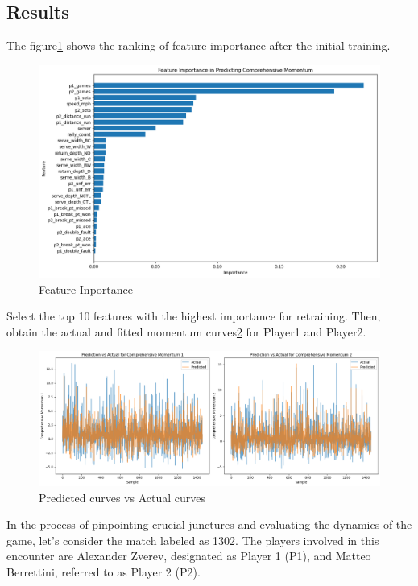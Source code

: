 \documentclass[12pt]{article}  %
\begin{document}
\subsection{Results}
The figure\ref{feature} shows the ranking of feature importance 
after the initial training.
\begin{figure}[h]  %
    \centering  %
    \includegraphics[width=.9\textwidth]{feature_inmportance.png} %
    \caption{Feature Inportance} %
    \label{feature}
\end{figure}

Select the top 10 features with the highest importance for retraining. 
Then, obtain the actual and fitted momentum curves\ref*{pred_act} for Player1 and Player2.
\begin{figure}[h]  %
    \centering  %
    \includegraphics[width=.9\textwidth]{pred_act.png} %
    \caption{Predicted curves vs Actual curves} %
    \label{pred_act}
\end{figure}

In the process of pinpointing crucial junctures and evaluating
the dynamics of the game, let's consider the match labeled as 1302.
The players involved in this encounter are Alexander Zverev, 
designated as Player 1 (P1), and Matteo Berrettini, 
referred to as Player 2 (P2).
\end{document}
